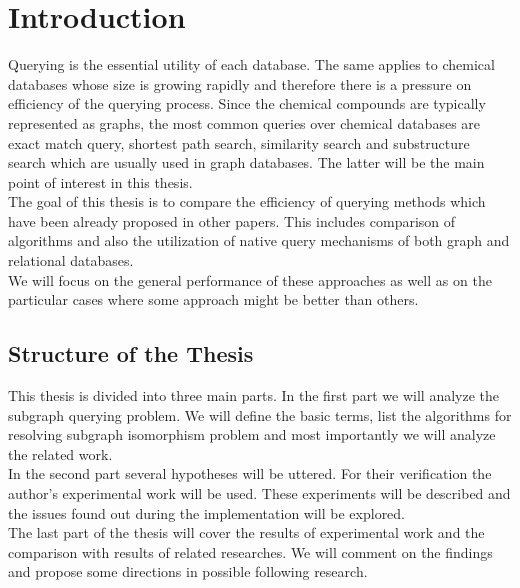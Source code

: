 \chapter*{Introduction}

Querying is the essential utility of each database. The same applies to chemical databases whose size is growing rapidly and therefore there is a pressure on efficiency of the querying process. Since the chemical compounds are typically represented as graphs, the most common queries over chemical databases are exact match query, shortest path search, similarity search and substructure search which are usually used in graph databases. The latter will be the main point of interest in this thesis.\\

The goal of this thesis is to compare the efficiency of querying methods which have been already proposed in other papers. This includes comparison of algorithms and also the utilization of native query mechanisms of both graph and relational databases.\\

We will focus on the general performance of these approaches as well as on the particular cases where some approach might be better than others.


\section*{Structure of the Thesis}

This thesis is divided into three main parts. In the first part we will analyze the subgraph querying problem. We will define the basic terms, list the algorithms for resolving subgraph isomorphism problem and most importantly we will analyze the related work. \\

In the second part several hypotheses will be uttered. For their verification the author’s experimental work will be used. These experiments will be described and the issues found out during the implementation will be explored.\\

The last part of the thesis will cover the results of experimental work and the comparison with results of related researches. We will comment on the findings and propose some directions in possible following research.
